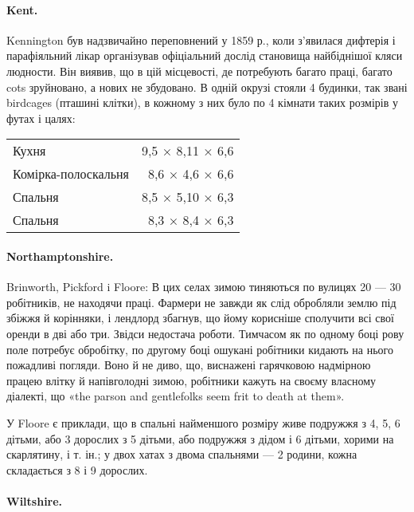 \paragraph{Kent.}

Kennington був надзвичайно переповнений у 1859 р., коли
з’явилася дифтерія і парафіяльний лікар організував офіціальний
дослід становища найбіднішої кляси людности. Він виявив, що
в цій місцевості, де потребують багато праці, багато cots зруйновано,
а нових не збудовано. В одній окрузі стояли 4 будинки,
так звані birdcages (пташині клітки), в кожному з них було по
4 кімнати таких розмірів у футах і цалях:

\begin{table}[h]
  \centering
  \begin{tabular}{lr}
    Кухня\dotfill{} & 9,5 × 8,11 × 6,6 \\
    Комірка-полоскальня & 8,6 × 4,6\phantom{0} × 6,6 \\
    Спальня\dotfill{}&8,5 × 5,10 × 6,3 \\
    Спальня\dotfill{}&8,3 × 8,4\phantom{0} × 6,3 \\
  \end{tabular}
\end{table}

\paragraph{Northamptonshire.}
Brinworth, Pickford i Floore: В цих селах зимою тиняються
по вулицях 20 — 30 робітників, не находячи праці. Фармери не
завжди як слід обробляли землю під збіжжя й корінняки, і лендлорд
збагнув, що йому корисніше сполучити всі свої оренди
в дві або три. Звідси недостача роботи. Тимчасом як по одному
боці рову поле потребує обробітку, по другому боці ошукані
робітники кидають на нього пожадливі погляди. Воно й не диво,
що, виснажені гарячковою надмірною працею влітку й напівголодні
зимою, робітники кажуть на своєму власному діалекті,
що «the parson and gentlefolks seem frit to death at them».

У Floore є приклади, що в спальні найменшого розміру живе
подружжя з 4, 5, 6 дітьми, або 3 дорослих з 5 дітьми, або подружжя
з дідом і 6 дітьми, хорими на скарлятину, і т. ін.; у двох
хатах з двома спальнями — 2 родини, кожна складається з 8
і 9 дорослих.

\paragraph{Wiltshire.}

